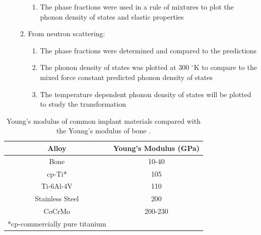 \begin{enumerate}
\begin{enumerate}
\begin{enumerate}
			\item The phase fractions were used in a rule of mixtures to plot the phonon density of states and elastic properties
		\end{enumerate}
		\item From neutron scattering:
		\begin{enumerate}
			\item The phase fractions were determined and compared to the predictions
			\item The phonon density of states was plotted at 300 $^\circ$K to compare to the mixed force constant predicted phonon density of states 
			\item The temperature dependent phonon density of states will be plotted to study the transformation 
		\end{enumerate}
	\end{enumerate} 
\end{enumerate}
				
\pagebreak
\begin{table}[H]
	\caption{Young's modulus of common implant materials compared with the Young's modulus of bone \cite{Long1998a}.}
	\centering
	\begin{tabular}{ c c }
		\hline
		Alloy & Young's Modulus (GPa) \\
		\hline
		Bone & 10-40\\
		cp-Ti* & 105\\
		Ti-6Al-4V & 110\\
		Stainless Steel & 200\\
		CoCrMo & 200-230\\
		\hline
		*cp-commercially pure titanium 
	\end{tabular}
\label{table:commonEM}
\end{table}
\clearpage

